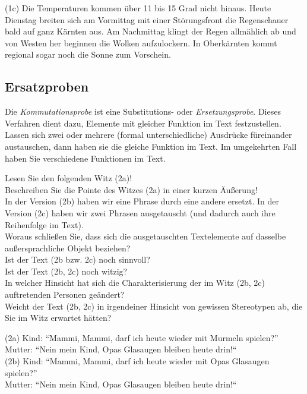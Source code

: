 \documentclass[
  letterpaper,
  DIV=11,
  numbers=noendperiod]{scrreprt}
\begin{document}
(1c) Die Temperaturen kommen über 11 bis 15 Grad nicht hinaus. Heute
Dienstag breiten sich am Vormittag mit einer Störungsfront die
Regenschauer bald auf ganz Kärnten aus. Am Nachmittag klingt der Regen
allmählich ab und von Westen her beginnen die Wolken aufzulockern. In
Oberkärnten kommt regional sogar noch die Sonne zum Vorschein.

\hypertarget{ersatzproben}{%
\subsection{Ersatzproben}\label{ersatzproben}}

Die \emph{Kommutationsprobe} ist eine Substitutions- oder
\emph{Ersetzungsprobe}. Dieses Verfahren dient dazu, Elemente mit
gleicher Funktion im Text festzustellen. Lassen sich zwei oder mehrere
(formal unterschiedliche) Ausdrücke füreinander austauschen, dann haben
sie die gleiche Funktion im Text. Im umgekehrten Fall haben Sie
verschiedene Funktionen im Text.

Lesen Sie den folgenden Witz (2a)!\\
Beschreiben Sie die Pointe des Witzes (2a) in einer kurzen Äußerung!\\
In der Version (2b) haben wir eine Phrase durch eine andere ersetzt. In
der Version (2c) haben wir zwei Phrasen ausgetauscht (und dadurch auch
ihre Reihenfolge im Text).\\
Woraus schließen Sie, dass sich die ausgetauschten Textelemente auf
dasselbe außersprachliche Objekt beziehen?\\
Ist der Text (2b bzw. 2c) noch sinnvoll?\\
Ist der Text (2b, 2c) noch witzig?\\
In welcher Hinsicht hat sich die Charakterisierung der im Witz (2b, 2c)
auftretenden Personen geändert?\\
Weicht der Text (2b, 2c) in irgendeiner Hinsicht von gewissen
Stereotypen ab, die Sie im Witz erwartet hätten?

(2a) Kind: ``Mammi, Mammi, darf ich heute wieder mit Murmeln
spielen?''\\
Mutter: ``Nein mein Kind, Opas Glasaugen bleiben heute drin!{}``\\

(2b) Kind: ``Mammi, Mammi, darf ich heute wieder mit Opas Glasaugen
spielen?''\\
Mutter: ``Nein mein Kind, Opas Glasaugen bleiben heute drin!{}``\\
\end{document}
